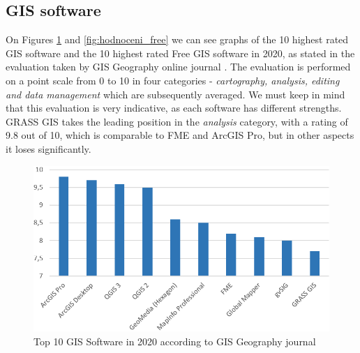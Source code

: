 \documentclass[a4paper,10pt,twoside]{article}
\begin{document}
\subsection{GIS software}
\label{subsection:GIS software}

\noindent On Figures \ref{fig:hodnoceni_all} and  \ref{fig:hodnoceni_free} we can see graphs of the 10 highest rated GIS software and the 10 highest rated Free GIS software in 2020, as stated in the evaluation taken by GIS Geography online journal \cite{gisgeography}. The evaluation is performed on a point scale from 0 to 10 in four categories - \textit{cartography, analysis, editing and data management} which are subsequently averaged. We must keep in mind that this evaluation is very indicative, as each software has different strengths. GRASS GIS takes the leading position in the \textit{analysis} category, with a rating of 9.8 out of 10, which is comparable to FME and ArcGIS Pro, but in other aspects it loses significantly.

\vspace{0.3cm}
\begin{figure}[hbt!] 
\begin{center}
\includegraphics[width=13cm]{../pictures/hodnoceni_all.png} 
\caption[Top 10 GIS Software in 2020 according to GISGeography journal]{Top 10 GIS Software in 2020 according to GIS Geography journal \cite{gisgeography}}
\label{fig:hodnoceni_all}
\end{center}
\end{figure}
\end{document}
